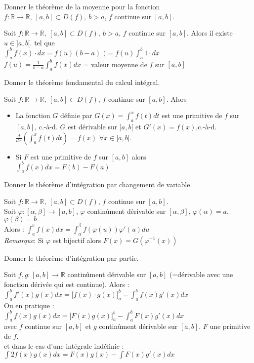 \documentclass[12pt]{article}
\newcommand*{\xfield}[1]{\begin{mdframed}\centering #1\end{mdframed}\bigskip}
\newenvironment{note}{}{}
\begin{document}
\begin{note}
	\xfield{Donner le théorème de la moyenne pour la fonction $f: \mathbb{R} \to \mathbb{R},\ [a,b] \subset D(f),\ b>a$, $f$ continue sur $[a,b]$.}
	\xfield{Soit $f: \mathbb{R} \to \mathbb{R},\ [a,b] \subset D(f),\ b>a$, $f$ continue sur $[a,b]$. Alors il existe $u \in ]a,b[$. tel que\\
	$\int_a^b f(x) \cdot dx = f(u) (b-a)$   $(=f(u) \int_a^b 1 \cdot dx$\\
	$f(u) = \frac{1}{b-a} \int_a^b f(x) dx$ = valeur moyenne de $f$ sur $[a,b]$}
\end{note}

\begin{note}
	\xfield{Donner le théorème fondamental du calcul intégral.}
	\xfield{Soit $f: \mathbb{R} \to \mathbb{R},\ [a,b] \subset D(f)$, $f$ continue sur $[a,b]$. Alors 
	\begin{itemize}
		\item La fonction $G$ définie par $G(x) = \int_a^x f(t) dt$ est une primitive de $f$ sur $[a,b]$, c.-à-d. $G$ est dérivable sur $]a,b[$ et $G'(x) = f(x)$,c.-à-d.\\
		$\frac{d}{dx}\left(\int_a^x f(t) dt\right) = f(x)$		$\forall x \in ]a,b[$.
		\item Si $F$ est une primitive de $f$ sur $[a,b]$ alors \\
		$\int_a^b f(x) dx = F(b) - F(a)$
	\end{itemize} }
\end{note}

\begin{note}
	\xfield{Donner le théorème d'intégration par changement de variable.}
	\xfield{Soit $f: \mathbb{R} \to \mathbb{R},\ [a,b] \subset D(f)$, $f$ continue sur $[a,b]$.\\
	Soit $\varphi : [\alpha,\beta] \to [a,b]$, $\varphi$ continûment dérivable sur $[\alpha,\beta]$, $\varphi(\alpha) = a$, $\varphi(\beta) = b$\\
	Alors : $\int_a^b f(x) dx = \int_\alpha^\beta f(\varphi(u))\varphi'(u) du$\\
	\emph{Remarque}: Si $\varphi$ est bijectif alors $F(x) = G(\varphi^{-1}(x))$ }
\end{note}

\begin{note}
	\xfield{Donner le théorème d'intégration par partie.}
	\xfield{Soit $f,g : [a,b] \to \mathbb{R}$ continûment dérivable sur $[a,b]$ (=dérivable avec une fonction dérivée qui est continue). Alors :\\
	$\int_a^b f'(x)g(x) dx = \big[f(x)\cdot g(x)\big]_a^b - \int_a^b f(x)g'(x) dx$\\
	Ou en pratique :\\
	$\int_a^b f(x)g(x) dx = \big[ F(x) g(x)\big]_a^b - \int_a^b F(x) g'(x) dx$\\
	avec $f$ continue sur $[a,b]$ et $g$ continûment dérivable sur $[a,b]$. $F$ une primitive de $f$.\\
	et dans le cas d'une intégrale indéfinie :\\
	$\int2 f(x)g(x) dx = F(x)g(x) - \int F(x)g'(x) dx$ }
\end{note}
\end{document}
